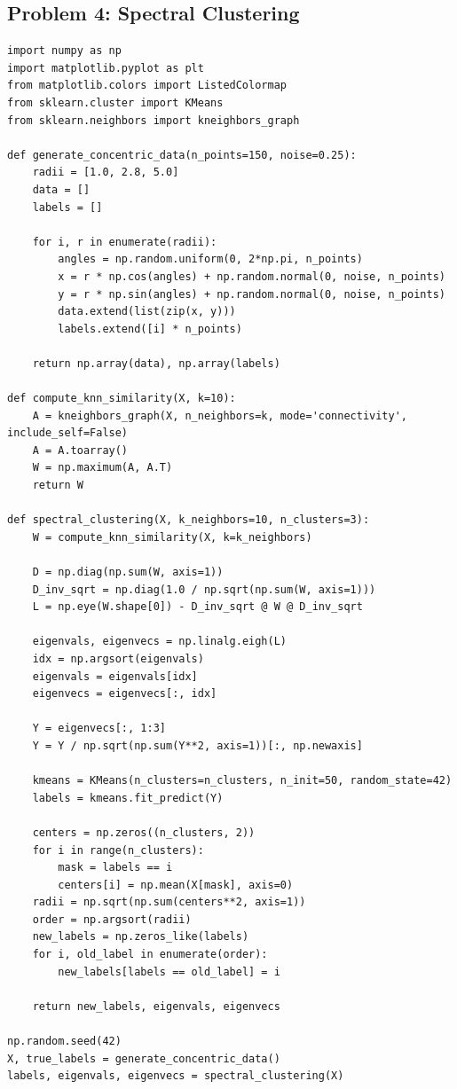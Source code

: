 \documentclass[11pt]{article}
\begin{document}
\subsection{Problem 4: Spectral Clustering}
\begin{verbatim}
import numpy as np
import matplotlib.pyplot as plt
from matplotlib.colors import ListedColormap
from sklearn.cluster import KMeans
from sklearn.neighbors import kneighbors_graph

def generate_concentric_data(n_points=150, noise=0.25):
    radii = [1.0, 2.8, 5.0]
    data = []
    labels = []
    
    for i, r in enumerate(radii):
        angles = np.random.uniform(0, 2*np.pi, n_points)
        x = r * np.cos(angles) + np.random.normal(0, noise, n_points)
        y = r * np.sin(angles) + np.random.normal(0, noise, n_points)
        data.extend(list(zip(x, y)))
        labels.extend([i] * n_points)
    
    return np.array(data), np.array(labels)

def compute_knn_similarity(X, k=10):
    A = kneighbors_graph(X, n_neighbors=k, mode='connectivity', include_self=False)
    A = A.toarray()
    W = np.maximum(A, A.T)
    return W

def spectral_clustering(X, k_neighbors=10, n_clusters=3):
    W = compute_knn_similarity(X, k=k_neighbors)
    
    D = np.diag(np.sum(W, axis=1))
    D_inv_sqrt = np.diag(1.0 / np.sqrt(np.sum(W, axis=1)))
    L = np.eye(W.shape[0]) - D_inv_sqrt @ W @ D_inv_sqrt
    
    eigenvals, eigenvecs = np.linalg.eigh(L)
    idx = np.argsort(eigenvals)
    eigenvals = eigenvals[idx]
    eigenvecs = eigenvecs[:, idx]
    
    Y = eigenvecs[:, 1:3]
    Y = Y / np.sqrt(np.sum(Y**2, axis=1))[:, np.newaxis]
    
    kmeans = KMeans(n_clusters=n_clusters, n_init=50, random_state=42)
    labels = kmeans.fit_predict(Y)
    
    centers = np.zeros((n_clusters, 2))
    for i in range(n_clusters):
        mask = labels == i
        centers[i] = np.mean(X[mask], axis=0)
    radii = np.sqrt(np.sum(centers**2, axis=1))
    order = np.argsort(radii)
    new_labels = np.zeros_like(labels)
    for i, old_label in enumerate(order):
        new_labels[labels == old_label] = i
    
    return new_labels, eigenvals, eigenvecs

np.random.seed(42)
X, true_labels = generate_concentric_data()
labels, eigenvals, eigenvecs = spectral_clustering(X)


\end{verbatim}
\end{document}
